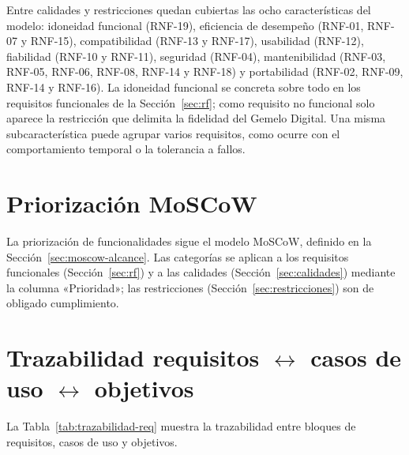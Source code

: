 Entre calidades y restricciones quedan cubiertas las ocho características del modelo: idoneidad funcional (RNF-19), eficiencia de desempeño (RNF-01, RNF-07 y RNF-15), compatibilidad (RNF-13 y RNF-17), usabilidad (RNF-12), fiabilidad (RNF-10 y RNF-11), seguridad (RNF-04), mantenibilidad (RNF-03, RNF-05, RNF-06, RNF-08, RNF-14 y RNF-18) y portabilidad (RNF-02, RNF-09, RNF-14 y RNF-16). La idoneidad funcional se concreta sobre todo en los requisitos funcionales de la Sección~\ref{sec:rf}; como requisito no funcional solo aparece la restricción que delimita la fidelidad del Gemelo Digital. Una misma subcaracterística puede agrupar varios requisitos, como ocurre con el comportamiento temporal o la tolerancia a fallos.

\section{Priorización MoSCoW}

La priorización de funcionalidades sigue el modelo MoSCoW, definido en la Sección~\ref{sec:moscow-alcance}. Las categorías se aplican a los requisitos funcionales (Sección~\ref{sec:rf}) y a las calidades (Sección~\ref{sec:calidades}) mediante la columna «Prioridad»; las restricciones (Sección~\ref{sec:restricciones}) son de obligado cumplimiento.

\section{Trazabilidad requisitos \texorpdfstring{$\leftrightarrow$}{<->} casos de uso \texorpdfstring{$\leftrightarrow$}{<->} objetivos}

La Tabla~\ref{tab:trazabilidad-req} muestra la trazabilidad entre bloques de requisitos, casos de uso y objetivos.

